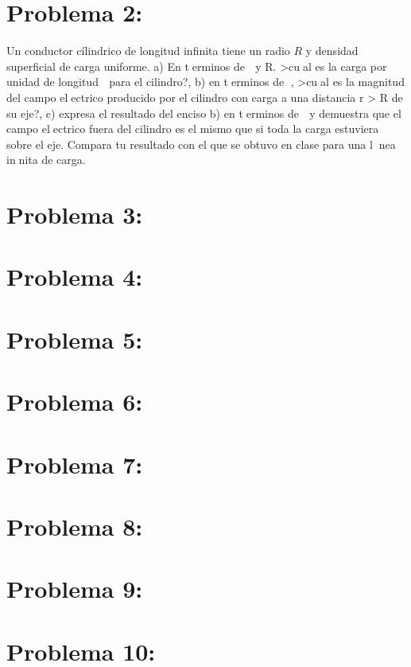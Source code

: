 \documentclass[12pt]{article}
\begin{document}
		\section{Problema 2:}\label{sec:Problema2}
			Un conductor cílindrico de longitud infinita tiene un radio $ R $ y densidad superficial
			de carga uniforme. a) En terminos de  y R. >cual es la carga por unidad de
			longitud  para el cilindro?, b) en terminos de , >cual es la magnitud del campo
			electrico producido por el cilindro con carga a una distancia r > R de su eje?,
			c) expresa el resultado del enciso b) en terminos de  y demuestra que el campo
			electrico fuera del cilindro es el mismo que si toda la carga estuviera sobre el eje.
			Compara tu resultado con el que se obtuvo en clase para una lnea innita de carga.


		\section{Problema 3:}\label{sec:Problema3}

		\section{Problema 4:}\label{sec:Problema4}

		\section{Problema 5:}\label{sec:Problema5}

		\section{Problema 6:}\label{sec:Problema6}
			
		\section{Problema 7:}\label{sec:Problema7}

		\section{Problema 8:}\label{sec:Problema8}

		\section{Problema 9:}\label{sec:Problema9}

		\section{Problema 10:}\label{sec:Problema10}

	
\end{document}
